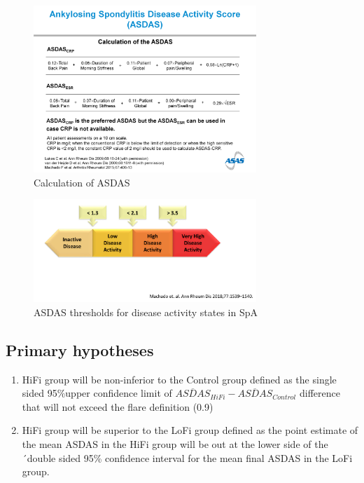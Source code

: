 \documentclass{article}\usepackage[]{graphicx}\usepackage[]{color}
\begin{document}
\begin{figure}
  \centering
  \includegraphics[width=0.75\textwidth]{ASDAS.png}
  \caption {Calculation of ASDAS}
  \label{fig:asdas}
\end{figure}

\begin{figure}
  \centering
  \includegraphics[width=0.75\textwidth]{asdasactivity.png}
  \caption{ASDAS thresholds for disease activity states in SpA}
  \label{fig:asdasactivity}
\end{figure}

\subsection{Primary hypotheses}

\begin{enumerate}
\item HiFi group will be non-inferior to the Control group defined as the single sided 95\%upper confidence limit of  $\overline{ASDAS}_{HiFi} - \overline{ASDAS}_{Control}$ difference that will not exceed the flare definition (0.9)
\item HiFi group will be superior to the LoFi group defined as the point estimate of the mean ASDAS in the HiFi group will be out at the lower side of the ´double sided 95\% confidence interval for the mean final ASDAS in the LoFi group.
\end{enumerate}
\end{document}
